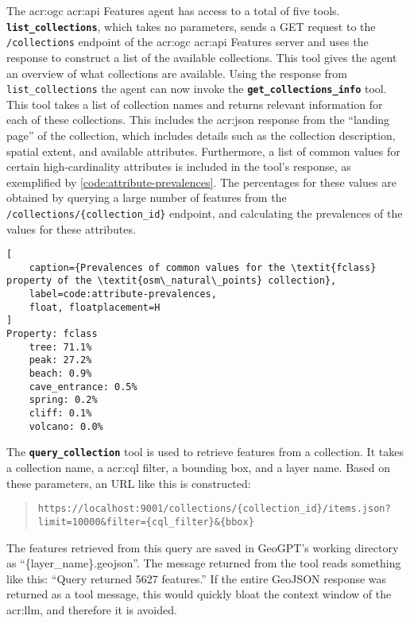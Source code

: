
The \acrshort{acr:ogc} \acrshort{acr:api} Features agent has access to a total of five tools. \textbf{\texttt{list\_collections}}, which takes no parameters, sends a GET request to the \texttt{/collections} endpoint of the \acrshort{acr:ogc} \acrshort{acr:api} Features server and uses the response to construct a list of the available collections. This tool gives the agent an overview of what collections are available. Using the response from \texttt{list\_collections} the agent can now invoke the \textbf{\texttt{get\_collections\_info}} tool. This tool takes a list of collection names and returns relevant information for each of these collections. This includes the \acrshort{acr:json} response from the \enquote{landing page} of the collection, which includes details such as the collection description, spatial extent, and available attributes. Furthermore, a list of common values for certain high-cardinality attributes is included in the tool's response, as exemplified by \autoref{code:attribute-prevalences}. The percentages for these values are obtained by querying a large number of features from the \texttt{/collections/\{collection\_id\}} endpoint, and calculating the prevalences of the values for these attributes.

\begin{lstlisting}[
    caption={Prevalences of common values for the \textit{fclass} property of the \textit{osm\_natural\_points} collection},
    label=code:attribute-prevalences,
    float, floatplacement=H
]
Property: fclass
    tree: 71.1%
    peak: 27.2%
    beach: 0.9%
    cave_entrance: 0.5%
    spring: 0.2%
    cliff: 0.1%
    volcano: 0.0%
\end{lstlisting}

The \textbf{\texttt{query\_collection}} tool is used to retrieve features from a collection. It takes a collection name, a \acrshort{acr:cql} filter, a bounding box, and a layer name. Based on these parameters, an URL like this is constructed:

\begin{quote}
    \texttt{https://localhost:9001/collections/\{collection\_id\}/items.json?limit=10000\&filter=\{cql\_filter\}\&\{bbox\}}
\end{quote}

The features retrieved from this query are saved in GeoGPT's working directory as \enquote{\{layer\_name\}.geojson}. The message returned from the tool reads something like this: \enquote{Query returned 5627 features.} If the entire GeoJSON response was returned as a tool message, this would quickly bloat the context window of the \acrshort{acr:llm}, and therefore it is avoided.

